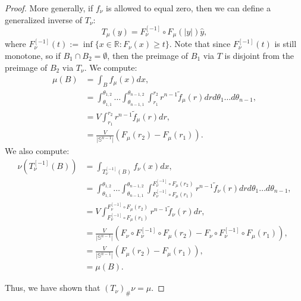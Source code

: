 \documentclass{amsart}
\theoremstyle{lemma}
\theoremstyle{remark}
\begin{document}
\begin{proof}
More generally, if $f_{\nu}$ is allowed to equal zero, then we can define a generalized inverse of $T_{\nu}$:
\begin{equation}
T_{\mu}(y) = F_{\nu}^{[-1]} \circ F_{\mu}(\vert y \vert) \hat{y},
\end{equation}
where $F_{\nu}^{[-1]}(t) := \inf \{ x \in \mathbb{R} : F_{\nu}(x) \geq t \}$. Note that since $F_{\nu}^{[-1]}(t)$ is still monotone, so if $B_1 \cap B_2 = \emptyset$, then the preimage of $B_1$ via $T$ is disjoint from the preimage of $B_2$ via $T_{\nu}$. We compute:
\begin{align}
\mu(B) &= \int_{B} f_{\mu}(x) dx, \\
&= \int_{\theta_{1, 1}}^{\theta_{1, 2}} \dots \int_{\theta_{n-1, 1}}^{\theta_{n-1, 2}} \int_{r_{1}}^{r_{2}} r^{n-1} \tilde{f}_{\mu}(r) dr d\theta_{1} \dots d\theta_{n-1}, \\
&= V \int_{r_{1}}^{r_{2}} r^{n-1} \tilde{f}_{\mu}(r) dr, \\
&= \frac{V}{\vert \mathbb{S}^{n-1} \vert}(F_{\mu}(r_2) - F_{\mu}(r_1)).
\end{align}
We also compute:
\begin{align}
\nu (T_{\nu}^{[-1]}(B)) &= \int_{T_{\nu}^{[-1]}(B)} f_{\nu}(x) dx, \\
&= \int_{\theta_{1, 1}}^{\theta_{1, 2}} \dots \int_{\theta_{n-1, 1}}^{\theta_{n-1, 2}} \int_{F_{\nu}^{[-1]} \circ F_{\mu}(r_{1})}^{F_{\nu}^{[-1]} \circ F_{\mu}(r_{2})} r^{n-1} \tilde{f}_{\nu}(r) dr d\theta_{1} \dots d\theta_{n-1}, \\
&= V \int_{F_{\nu}^{[-1]} \circ F_{\mu}(r_{1})}^{F_{\nu}^{[-1]} \circ F_{\mu}(r_{2})} r^{n-1} \tilde{f}_{\nu}(r) dr, \\
&= \frac{V}{\vert \mathbb{S}^{n-1} \vert} (F_{\nu} \circ F_{\nu}^{[-1]} \circ F_{\mu}(r_2) - F_{\nu} \circ F_{\nu}^{[-1]} \circ F_{\mu}(r_1)), \\
&= \frac{V}{\vert \mathbb{S}^{n-1} \vert} (F_{\mu}(r_2) - F_{\mu}(r_1)), \\
&= \mu(B).
\end{align}

Thus, we have shown that $(T_{\nu})_{\#}\nu = \mu$.


\end{proof}
\end{document}
